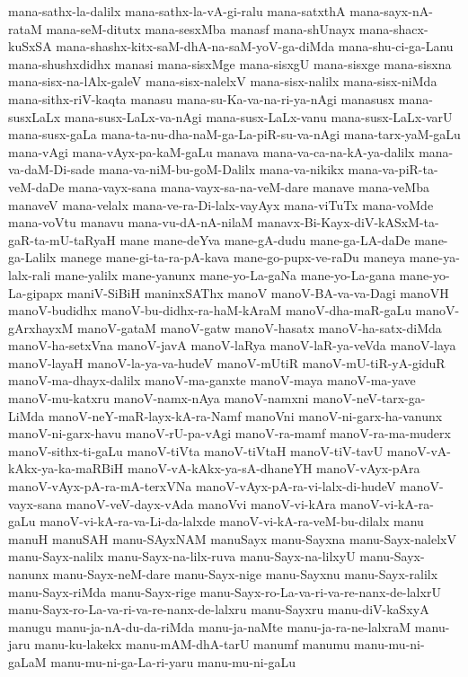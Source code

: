 {mana-sathx-la-dalilx
mana-sathx-la-vA-gi-ralu
mana-satxthA
mana-sayx-nA-rataM
mana-seM-ditutx
mana-sesxMba
manasf
mana-shUnayx
mana-shacx-kuSxSA
mana-shashx-kitx-saM-dhA-na-saM-yoV-ga-diMda
mana-shu-ci-ga-Lanu
mana-shushxdidhx
manasi
mana-sisxMge
mana-sisxgU
mana-sisxge
mana-sisxna
mana-sisx-na-lAlx-galeV
mana-sisx-nalelxV
mana-sisx-nalilx
mana-sisx-niMda
mana-sithx-riV-kaqta
manasu
mana-su-Ka-va-na-ri-ya-nAgi
manasusx
mana-susxLaLx
mana-susx-LaLx-va-nAgi
mana-susx-LaLx-vanu
mana-susx-LaLx-varU
mana-susx-gaLa
mana-ta-nu-dha-naM-ga-La-piR-su-va-nAgi
mana-tarx-yaM-gaLu
mana-vAgi
mana-vAyx-pa-kaM-gaLu
manava
mana-va-ca-na-kA-ya-dalilx
mana-va-daM-Di-sade
mana-va-niM-bu-goM-Dalilx
mana-va-nikikx
mana-va-piR-ta-veM-daDe
mana-vayx-sana
mana-vayx-sa-na-veM-dare
manave
mana-veMba
manaveV
mana-velalx
mana-ve-ra-Di-lalx-vayAyx
mana-viTuTx
mana-voMde
mana-voVtu
manavu
mana-vu-dA-nA-nilaM
manavx-Bi-Kayx-diV-kASxM-ta-gaR-ta-mU-taRyaH
mane
mane-deYva
mane-gA-dudu
mane-ga-LA-daDe
mane-ga-Lalilx
manege
mane-gi-ta-ra-pA-kava
mane-go-pupx-ve-raDu
maneya
mane-ya-lalx-rali
mane-yalilx
mane-yanunx
mane-yo-La-gaNa
mane-yo-La-gana
mane-yo-La-gipapx
maniV-SiBiH
maninxSAThx
manoV
manoV-BA-va-va-Dagi
manoVH
manoV-budidhx
manoV-bu-didhx-ra-haM-kAraM
manoV-dha-maR-gaLu
manoV-gArxhayxM
manoV-gataM
manoV-gatw
manoV-hasatx
manoV-ha-satx-diMda
manoV-ha-setxVna
manoV-javA
manoV-laRya
manoV-laR-ya-veVda
manoV-laya
manoV-layaH
manoV-la-ya-va-hudeV
manoV-mUtiR
manoV-mU-tiR-yA-giduR
manoV-ma-dhayx-dalilx
manoV-ma-ganxte
manoV-maya
manoV-ma-yave
manoV-mu-katxru
manoV-namx-nAya
manoV-namxni
manoV-neV-tarx-ga-LiMda
manoV-neY-maR-layx-kA-ra-Namf
manoVni
manoV-ni-garx-ha-vanunx
manoV-ni-garx-havu
manoV-rU-pa-vAgi
manoV-ra-mamf
manoV-ra-ma-muderx
manoV-sithx-ti-gaLu
manoV-tiVta
manoV-tiVtaH
manoV-tiV-tavU
manoV-vA-kAkx-ya-ka-maRBiH
manoV-vA-kAkx-ya-sA-dhaneYH
manoV-vAyx-pAra
manoV-vAyx-pA-ra-mA-terxVNa
manoV-vAyx-pA-ra-vi-lalx-di-hudeV
manoV-vayx-sana
manoV-veV-dayx-vAda
manoVvi
manoV-vi-kAra
manoV-vi-kA-ra-gaLu
manoV-vi-kA-ra-va-Li-da-lalxde
manoV-vi-kA-ra-veM-bu-dilalx
manu
manuH
manuSAH
manu-SAyxNAM
manuSayx
manu-Sayxna
manu-Sayx-nalelxV
manu-Sayx-nalilx
manu-Sayx-na-lilx-ruva
manu-Sayx-na-lilxyU
manu-Sayx-nanunx
manu-Sayx-neM-dare
manu-Sayx-nige
manu-Sayxnu
manu-Sayx-ralilx
manu-Sayx-riMda
manu-Sayx-rige
manu-Sayx-ro-La-va-ri-va-re-nanx-de-lalxrU
manu-Sayx-ro-La-va-ri-va-re-nanx-de-lalxru
manu-Sayxru
manu-diV-kaSxyA
manugu
manu-ja-nA-du-da-riMda
manu-ja-naMte
manu-ja-ra-ne-lalxraM
manu-jaru
manu-ku-lakekx
manu-mAM-dhA-tarU
manumf
manumu
manu-mu-ni-gaLaM
manu-mu-ni-ga-La-ri-yaru
manu-mu-ni-gaLu
}
